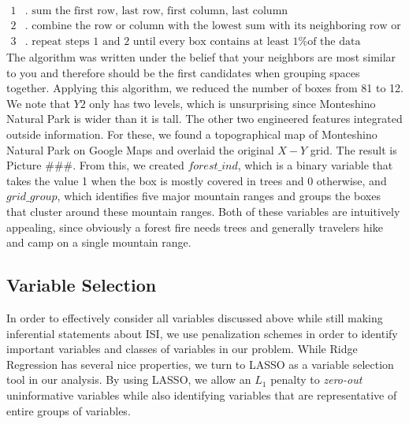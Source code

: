 \documentclass{article}
\begin{document}
\begin{itemize}
\begin{align*}
1&. \text{ sum the first row, last row, first column, last column} \\
2&. \text{ combine the row or column with the lowest sum with its neighboring row or column} \\
3&. \text{ repeat steps 1 and 2 until every box contains at least 1\% of the data}
\end{align*}
The algorithm was written under the belief that your neighbors are most similar to you and therefore should be the first candidates when grouping spaces together. Applying this algorithm, we reduced the number of boxes from 81 to 12. We note that $Y2$ only has two levels, which is unsurprising since Monteshino Natural Park is wider than it is tall. The other two engineered features integrated outside information. For these, we found a topographical map of Monteshino Natural Park on Google Maps and overlaid the original $X-Y$ grid.  The result is Picture \#\#\#. From this, we created $\textit{forest\_ind}$, which is a binary variable that takes the value 1 when the box is mostly covered in trees and 0 otherwise, and $\textit{grid\_group}$, which identifies five major mountain ranges and groups the boxes that cluster around these mountain ranges. Both of these variables are intuitively appealing, since obviously a forest fire needs trees and generally travelers hike and camp on a single mountain range.

\end{itemize}

\subsection{Variable Selection}

In order to effectively consider all variables discussed above while still making inferential statements about ISI, we use penalization schemes in order to identify important variables and classes of variables in our problem. While Ridge Regression has several nice properties, we turn to LASSO as a variable selection tool in our analysis. By using LASSO, we allow an $L_{1}$ penalty to \textit{zero-out} uninformative variables while also identifying variables that are representative of entire groups of variables. 
\end{document}
